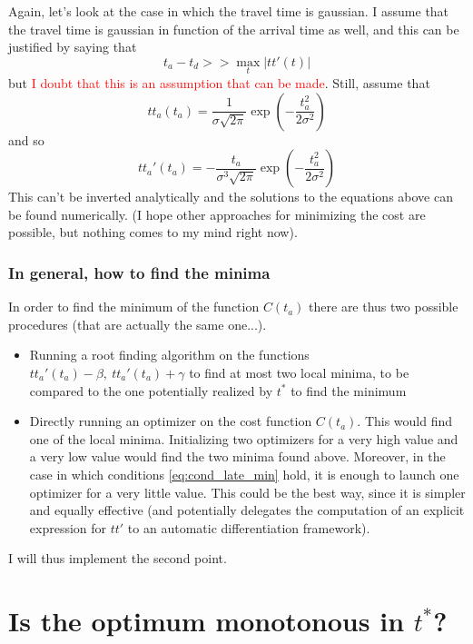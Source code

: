 \documentclass{article}
\begin{document}
Again, let's look at the case in which the travel time is gaussian.
I assume that the travel time is gaussian in function of the arrival time as well,
and this can be justified by saying that
\[t_a - t_d >> \max_t | tt'(t)|\]
but \textcolor{red}{I doubt that this is an assumption that can be made}.
Still, assume that
\begin{equation}
  \label{eq:travel_time_gauss}
  tt_a(t_a) = \frac{1}{\sigma\sqrt{2\pi}}\exp\left(-{\frac{t_a^2}{2\sigma^2}}\right)
\end{equation}
and so
\begin{equation}
  \label{eq:travel_time_gauss_diff}
  tt_a'(t_a) = -\frac{t_a}{\sigma^3\sqrt{2\pi}}\exp\left(-{\frac{t_a^2}{2\sigma^2}}\right)
\end{equation}
This can't be inverted analytically and the solutions to the equations above can be found numerically.
(I hope other approaches for minimizing the cost are possible, but nothing comes to my mind right now).

\subsubsection{In general, how to find the minima}


In order to find the minimum of the function \(C(t_a)\) there are thus two possible procedures (that are actually the same one...).
\begin{itemize}
\item Running a root finding algorithm on the functions \(tt_a'(t_a) - \beta,\ tt_a'(t_a) + \gamma\) to find at most two local minima, to be compared to the one potentially realized by \(t^*\) to find the minimum
\item Directly running an optimizer on the cost function \(C(t_a)\). This would find one of the local minima.
  Initializing two optimizers for a very high value and a very low value would find the two minima found above.
  Moreover, in the case in which conditions \eqref{eq:cond_late_min} hold,
  it is enough to launch one optimizer for a very little value.
  This could be the best way, since it is simpler and equally effective (and potentially delegates the computation of an explicit expression for \(tt'\) to an automatic differentiation framework).
\end{itemize}

I will thus implement the second point.

\section{Is the optimum monotonous in $t^*$?}
\end{document}
